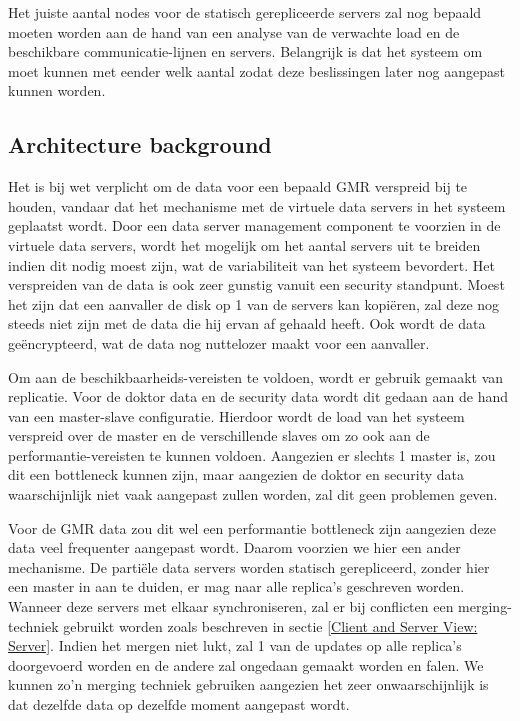 \documentclass[a4paper,10pt]{article}
\begin{document}
Het juiste aantal nodes voor de statisch gerepliceerde servers zal nog bepaald moeten worden aan de hand van een analyse van de verwachte load en de beschikbare communicatie-lijnen en servers. Belangrijk is dat het systeem om moet kunnen met eender welk aantal zodat deze beslissingen later nog aangepast kunnen worden.

\subsection{Architecture background}
Het is bij wet verplicht om de data voor een bepaald GMR verspreid bij te houden, vandaar dat het mechanisme met de virtuele data servers in het systeem geplaatst wordt. Door een data server management component te voorzien in de virtuele data servers, wordt het mogelijk om het aantal servers uit te breiden indien dit nodig moest zijn, wat de variabiliteit van het systeem bevordert. Het verspreiden van de data is ook zeer gunstig vanuit een security standpunt. Moest het zijn dat een aanvaller de disk op 1 van de servers kan kopiëren, zal deze nog steeds niet zijn met de data die hij ervan af gehaald heeft. Ook wordt de data geëncrypteerd, wat de data nog nuttelozer maakt voor een aanvaller.

Om aan de beschikbaarheids-vereisten te voldoen, wordt er gebruik gemaakt van replicatie. Voor de doktor data en de security data wordt dit gedaan aan de hand van een master-slave configuratie. Hierdoor wordt de load van het systeem verspreid over de master en de verschillende slaves om zo ook aan de performantie-vereisten te kunnen voldoen. Aangezien er slechts 1 master is, zou dit een bottleneck kunnen zijn, maar aangezien de doktor en security data waarschijnlijk niet vaak aangepast zullen worden, zal dit geen problemen geven.

Voor de GMR data zou dit wel een performantie bottleneck zijn aangezien deze data veel frequenter aangepast wordt. Daarom voorzien we hier een ander mechanisme. De partiële data servers worden statisch gerepliceerd, zonder hier een master in aan te duiden, er mag naar alle replica's geschreven worden. Wanneer deze servers met elkaar synchroniseren, zal er bij conflicten een merging-techniek gebruikt worden zoals beschreven in sectie \ref{Client and Server View: Server}. Indien het mergen niet lukt, zal 1 van de updates op alle replica's doorgevoerd worden en de andere zal ongedaan gemaakt worden en falen. We kunnen zo'n merging techniek gebruiken aangezien het zeer onwaarschijnlijk is dat dezelfde data op dezelfde moment aangepast wordt.
\end{document}

